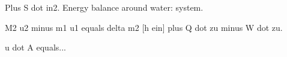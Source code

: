 Plus S dot in2.  
Energy balance around water: system.  

M2 u2 minus m1 u1 equals delta m2 [h ein] plus Q dot zu minus W dot zu.  

u dot A equals...